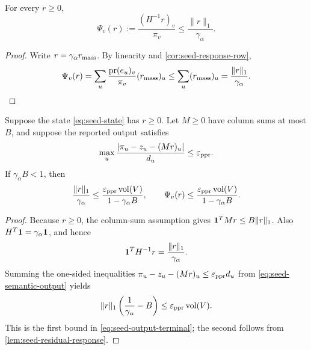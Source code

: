 \documentclass[11pt]{article}
\begin{document}
\begin{lemma}
\label{lem:seed-residual-response}
For every $r\ge0$,
\begin{equation}
 \Psi_v(r):=\frac{(H^{-1}r)_v}{\pi_v}
 \le \frac{\|r\|_1}{\gamma_{\alpha}}.
 \label{eq:seed-residual-response}
\end{equation}
\end{lemma}

\begin{proof}
Write $r=\gamma_{\alpha} r_{\rm mass}$.  By linearity and
\cref{cor:seed-response-row},
\[
 \Psi_v(r)
 =\sum_u\frac{\operatorname{pr}(e_u)_v}{\pi_v}(r_{\rm mass})_u
 \le\sum_u(r_{\rm mass})_u
 =\frac{\|r\|_1}{\gamma_{\alpha}}.
\]
\end{proof}

\begin{corollary}
\label{cor:seed-output-terminal}
Suppose the state \eqref{eq:seed-state} has $r\ge0$.  Let $M\ge0$ have
column sums at most $B$, and suppose the reported output satisfies
\begin{equation}
 \max_u\frac{|\pi_u-z_u-(Mr)_u|}{d_u}\le\varepsilon_{\mathrm{ppr}}.
 \label{eq:seed-semantic-output}
\end{equation}
If $\gamma_{\alpha} B<1$, then
\begin{equation}
 \frac{\|r\|_1}{\gamma_{\alpha}}
 \le\frac{\varepsilon_{\mathrm{ppr}}\operatorname{vol}(V)}{1-\gamma_{\alpha} B},
 \qquad
 \Psi_v(r)
 \le\frac{\varepsilon_{\mathrm{ppr}}\operatorname{vol}(V)}{1-\gamma_{\alpha} B}.
 \label{eq:seed-output-terminal}
\end{equation}
\end{corollary}

\begin{proof}
Because $r\ge0$, the column-sum assumption gives
$\mathbf{1}^TMr\le B\|r\|_1$.  Also
$H^T\mathbf{1}=\gamma_{\alpha}\mathbf{1}$, and hence
\begin{equation}
 \mathbf{1}^TH^{-1}r=\frac{\|r\|_1}{\gamma_{\alpha}}.
 \label{eq:seed-error-mass}
\end{equation}
Summing the one-sided inequalities
$\pi_u-z_u-(Mr)_u\le\varepsilon_{\mathrm{ppr}} d_u$ from
\eqref{eq:seed-semantic-output} yields
\[
 \|r\|_1\left(\frac1{\gamma_{\alpha}}-B\right)
 \le\varepsilon_{\mathrm{ppr}}\operatorname{vol}(V).
\]
This is the first bound in \eqref{eq:seed-output-terminal}; the second follows
from \cref{lem:seed-residual-response}.
\end{proof}
\end{document}
